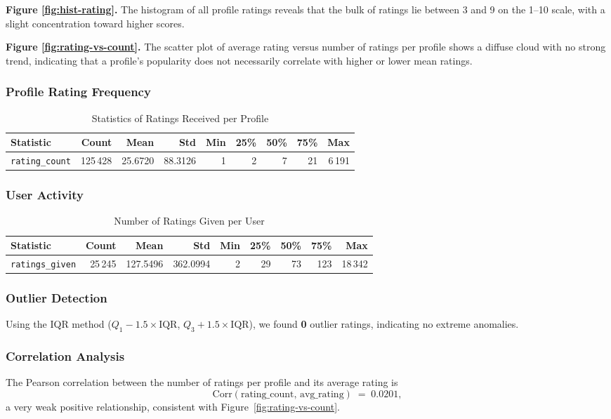 \noindent\textbf{Figure \ref{fig:hist-rating}.} The histogram of all profile ratings reveals that the bulk of ratings lie between 3 and 9 on the 1–10 scale, with a slight concentration toward higher scores.  

\noindent\textbf{Figure \ref{fig:rating-vs-count}.} The scatter plot of average rating versus number of ratings per profile shows a diffuse cloud with no strong trend, indicating that a profile’s popularity does not necessarily correlate with higher or lower mean ratings.  

\subsubsection*{Profile Rating Frequency}
\begin{table}[H]
  \centering
  \caption{Statistics of Ratings Received per Profile}
  \label{tab:profile-stats}
  \begin{tabular}{@{}lrrrrrrrr@{}}
    \toprule
    Statistic        & Count     & Mean    & Std     & Min & 25\% & 50\% & 75\% & Max   \\ 
    \midrule
    \texttt{rating\_count} & 125\,428 & 25.6720 & 88.3126 & 1   & 2    & 7    & 21   & 6\,191 \\
    \bottomrule
  \end{tabular}
\end{table}

\subsubsection*{User Activity}
\begin{table}[H]
  \centering
  \caption{Number of Ratings Given per User}
  \label{tab:user-stats}
  \begin{tabular}{@{}lrrrrrrrr@{}}
    \toprule
    Statistic          & Count    & Mean    & Std     & Min & 25\% & 50\% & 75\%   & Max      \\ 
    \midrule
    \texttt{ratings\_given} & 25\,245  & 127.5496 & 362.0994 & 2   & 29   & 73   & 123    & 18\,342  \\
    \bottomrule
  \end{tabular}
\end{table}

\subsubsection*{Outlier Detection}
Using the IQR method ($Q_1 - 1.5\times\mathrm{IQR}$, $Q_3 + 1.5\times\mathrm{IQR}$), we found \textbf{0} outlier ratings, indicating no extreme anomalies.

\subsubsection*{Correlation Analysis}
The Pearson correlation between the number of ratings per profile and its average rating is
\[
  \mathrm{Corr}(\text{rating\_count},\,\text{avg\_rating})
  \;=\;0.0201,
\]
a very weak positive relationship, consistent with Figure~\ref{fig:rating-vs-count}.